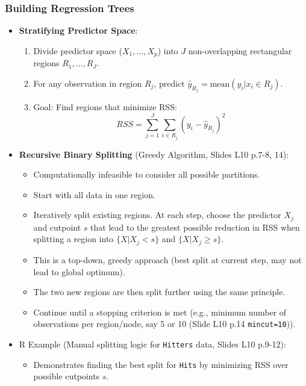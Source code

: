 \documentclass[12pt,a4paper]{article}
\newcommand{\Robject}[1]{\texttt{#1}} %
\newcommand{\Rcode}[1]{\texttt{#1}} %
\begin{document}
\begin{itemize}
    \subsubsection{Building Regression Trees }
        \begin{itemize}
            \item \textbf{Stratifying Predictor Space}:
                \begin{enumerate}
                    \item Divide predictor space ($X_1, \dots, X_p$) into $J$ non-overlapping rectangular regions $R_1, \dots, R_J$.
                    \item For any observation in region $R_j$, predict $\hat{y}_{R_j} = \text{mean}(y_i | x_i \in R_j)$.
                    \item Goal: Find regions that minimize RSS:
                        $$ RSS = \sum_{j=1}^{J} \sum_{i \in R_j} (y_i - \hat{y}_{R_j})^2 $$
                \end{enumerate}
            \item \textbf{Recursive Binary Splitting} (Greedy Algorithm, Slides L10 p.7-8, 14):
                \begin{itemize}
                    \item Computationally infeasible to consider all possible partitions.
                    \item Start with all data in one region.
                    \item Iteratively split existing regions. At each step, choose the predictor $X_j$ and cutpoint $s$ that lead to the greatest possible reduction in RSS when splitting a region into $\{X|X_j < s\}$ and $\{X|X_j \ge s\}$.
                    \item This is a top-down, greedy approach (best split at current step, may not lead to global optimum).
                    \item The two new regions are then split further using the same principle.
                    \item Continue until a stopping criterion is met (e.g., minimum number of observations per region/node, say 5 or 10 (Slide L10 p.14 \Rcode{mincut=10})).
                \end{itemize}
            \item R Example (Manual splitting logic for \Robject{Hitters} data, Slides L10 p.9-12):
                \begin{itemize}
                    \item Demonstrates finding the best split for \Rcode{Hits} by minimizing RSS over possible cutpoints $s$.

\end{itemize}
\end{itemize}
\end{itemize}
\end{document}
